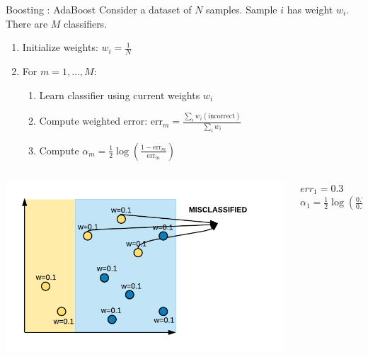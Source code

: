 \documentclass[aspectratio=169,10pt]{beamer}
\newcommand{\fitpic}[1]{\begin{adjustbox}{max width=\linewidth, max totalheight=0.78\textheight}#1\end{adjustbox}}
\begin{document}
\begin{frame}{Boosting : AdaBoost }
  Consider a dataset of $N$ samples. Sample $i$ has weight $w_i$. There are $M$ classifiers.\\[0.3cm]
  \begin{enumerate}
    \item Initialize weights: $w_i = \frac{1}{N}$
    \item For $m = 1, \ldots, M$:
          \begin{enumerate}
            \item Learn classifier using current weights $w_i$
            \item Compute weighted error: $\text{err}_m = \frac{\sum_i w_i(\text{incorrect})}{\sum_i w_i}$
            \item Compute $\alpha_m = \tfrac{1}{2}\log\!\left(\frac{1 - \text{err}_m}{\text{err}_m}\right)$
          \end{enumerate}
  \end{enumerate}
  \begin{columns}
    \begin{column}{0.5\textwidth}\centering
      \fitpic{\includegraphics[width=\textwidth]{../assets/ensemble/diagrams/ada_iter1_misclassify}}
    \end{column}
    \begin{column}{0.5\textwidth}
      $err_1 = 0.3$\\
      $\alpha_1 = \tfrac{1}{2}\log\!\left(\frac{0.7}{0.3}\right) \approx 0.42$
    \end{column}
  \end{columns}
\end{frame}
\end{document}
